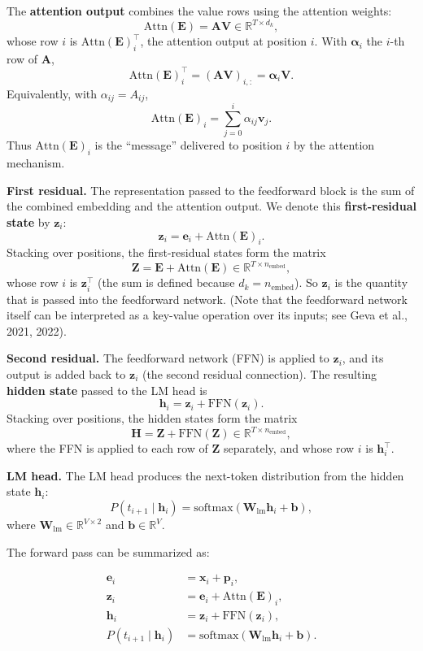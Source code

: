 \documentclass[
  11pt,
  a4paper,
]{article}
\begin{document}
The \textbf{attention output} combines the value rows using the
attention weights: \[
\mathrm{Attn}(\mathbf{E}) = \mathbf{A} \mathbf{V} \in \mathbb{R}^{T \times d_k},
\] whose row \(i\) is \(\mathrm{Attn}(\mathbf{E})_i^\top\), the
attention output at position \(i\). With \(\boldsymbol{\alpha}_i\) the
\(i\)-th row of \(\mathbf{A}\), \[
\mathrm{Attn}(\mathbf{E})_i^\top = (\mathbf{A} \mathbf{V})_{i,:} = \boldsymbol{\alpha}_i \mathbf{V}.
\] Equivalently, with \(\alpha_{ij} = A_{ij}\), \[
\mathrm{Attn}(\mathbf{E})_i = \sum_{j=0}^{i} \alpha_{ij} \mathbf{v}_j.
\] Thus \(\mathrm{Attn}(\mathbf{E})_i\) is the ``message'' delivered to
position \(i\) by the attention mechanism.

\textbf{First residual.} The representation passed to the feedforward
block is the sum of the combined embedding and the attention output. We
denote this \textbf{first-residual state} by \(\mathbf{z}_i\): \[
\mathbf{z}_i = \mathbf{e}_i + \mathrm{Attn}(\mathbf{E})_i.
\] Stacking over positions, the first-residual states form the matrix \[
\mathbf{Z} = \mathbf{E} + \mathrm{Attn}(\mathbf{E}) \in \mathbb{R}^{T \times n_{\mathrm{embed}}},
\] whose row \(i\) is \(\mathbf{z}_i^\top\) (the sum is defined because
\(d_k = n_{\mathrm{embed}}\)). So \(\mathbf{z}_i\) is the quantity that
is passed into the feedforward network. (Note that the feedforward
network itself can be interpreted as a key-value operation over its
inputs; see Geva et al., 2021, 2022).

\textbf{Second residual.} The feedforward network (FFN) is applied to
\(\mathbf{z}_i\), and its output is added back to \(\mathbf{z}_i\) (the
second residual connection). The resulting \textbf{hidden state} passed
to the LM head is \[
\mathbf{h}_i = \mathbf{z}_i + \mathrm{FFN}(\mathbf{z}_i).
\] Stacking over positions, the hidden states form the matrix \[
\mathbf{H} = \mathbf{Z} + \mathrm{FFN}(\mathbf{Z}) \in \mathbb{R}^{T \times n_{\mathrm{embed}}},
\] where the FFN is applied to each row of \(\mathbf{Z}\) separately,
and whose row \(i\) is \(\mathbf{h}_i^\top\).

\textbf{LM head.} The LM head produces the next-token distribution from
the hidden state \(\mathbf{h}_i\): \[
P(t_{i+1} \mid \mathbf{h}_i) = \mathrm{softmax}\!\left(\mathbf{W}_{\mathrm{lm}} \mathbf{h}_i + \mathbf{b}\right),
\] where \(\mathbf{W}_{\mathrm{lm}} \in \mathbb{R}^{V \times 2}\) and
\(\mathbf{b} \in \mathbb{R}^V\).

The forward pass can be summarized as:

\[
\begin{aligned}
\mathbf{e}_i &= \mathbf{x}_i + \mathbf{p}_i, \\
\mathbf{z}_i &= \mathbf{e}_i + \mathrm{Attn}(\mathbf{E})_i, \\
\mathbf{h}_i &= \mathbf{z}_i + \mathrm{FFN}(\mathbf{z}_i), \\
P(t_{i+1} \mid \mathbf{h}_i) &= \mathrm{softmax}\!\left(\mathbf{W}_{\mathrm{lm}} \mathbf{h}_i + \mathbf{b}\right).
\end{aligned}
\]
\end{document}
